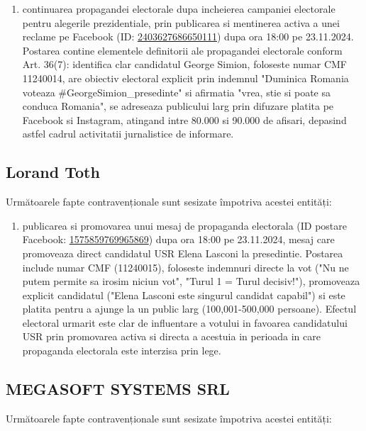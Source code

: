 \documentclass[a4paper,12pt]{article}
\begin{document}
\begin{enumerate}[leftmargin=*, label=\arabic*.)]
    \item continuarea propagandei electorale dupa incheierea campaniei electorale pentru alegerile prezidentiale, prin publicarea si mentinerea activa a unei reclame pe Facebook (ID: \href{https://www.facebook.com/ads/library/?id=2403627686650111}{2403627686650111}) dupa ora 18:00 pe 23.11.2024. Postarea contine elementele definitorii ale propagandei electorale conform Art. 36(7): identifica clar candidatul George Simion, foloseste numar CMF 11240014, are obiectiv electoral explicit prin indemnul "Duminica Romania voteaza \#GeorgeSimion\_presedinte" si afirmatia "vrea, stie si poate sa conduca Romania", se adreseaza publicului larg prin difuzare platita pe Facebook si Instagram, atingand intre 80.000 si 90.000 de afisari, depasind astfel cadrul activitatii jurnalistice de informare.
\end{enumerate}

\vspace{0.5cm}

\subsection{Lorand Toth}
Următoarele fapte contravenționale sunt sesizate împotriva acestei entități:

\begin{enumerate}[leftmargin=*, label=\arabic*.)]
    \item publicarea si promovarea unui mesaj de propaganda electorala (ID postare Facebook: \href{https://www.facebook.com/ads/library/?id=1575859769965869}{1575859769965869}) dupa ora 18:00 pe 23.11.2024, mesaj care promoveaza direct candidatul USR Elena Lasconi la presedintie. Postarea include numar CMF (11240015), foloseste indemnuri directe la vot ("Nu ne putem permite sa irosim niciun vot", "Turul 1 = Turul decisiv!"), promoveaza explicit candidatul ("Elena Lasconi este singurul candidat capabil") si este platita pentru a ajunge la un public larg (100,001-500,000 persoane). Efectul electoral urmarit este clar de influentare a votului in favoarea candidatului USR prin promovarea activa si directa a acestuia in perioada in care propaganda electorala este interzisa prin lege.
\end{enumerate}

\vspace{0.5cm}

\subsection{MEGASOFT SYSTEMS SRL}
Următoarele fapte contravenționale sunt sesizate împotriva acestei entități:
\end{document}

